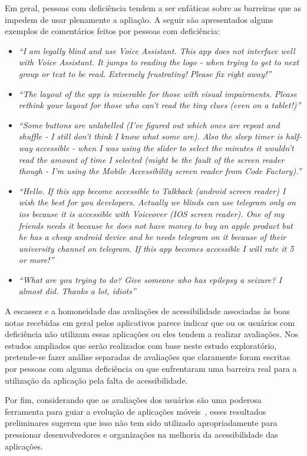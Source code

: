 Em geral, pessoas com deficiência tendem a ser enfáticas sobre as barreiras que as impedem de usar plenamente a apliação. A seguir são apresentados alguns exemplos de comentários feitos por pessoas com deficiência:
\begin{itemize}
 \item \textit{``I am legally blind and use Voice Assistant. This app does not interface well with Voice Assistant. It jumps to reading the logo - when trying to get to next group or text to be read. Extremely frustrating! Please fix right away!''}
  \item \textit{``The layout of the app is miserable for those with visual impairments. Please rethink your layout for those who can't read the tiny clues (even on a tablet!)''}
  \item \textit{``Some buttons are unlabelled (I've figured out which ones are repeat and shuffle - I still don't think I know what some are). Also the sleep timer is half-way accessible - when I was using the slider to select the minutes it wouldn't read the amount of time I selected (might be the fault of the screen reader though - I'm using the Mobile Accessibility screen reader from Code Factory).''}
  \item \textit{``Hello. If this app become accessible to Talkback (android screen reader) I wish the best for you developers. Actually we blinds can use telegram only on ios because it is accessible with Voiceover (IOS screen reader). One of my friends needs it because he does not have money to buy an apple product but he has a cheap android device and he needs telegram on it because of their university channel on telegram. If this app becomes accessible I will rate it 5 or more!''}
  \item \textit{``What are you trying to do? Give someone who has epilepsy a seizure? I almost did. Thanks a lot, idiots''}  
\end{itemize}

A escassez e a homoneidade das avaliações de acessibilidade associadas às boas notas recebidas em geral pelos aplicativos parece indicar que ou os usuários com deficiência não utilizam essas aplicações ou eles tendem a realizar avaliações. 
Nos estudos ampliados que serão realizados com base neste estudo exploratório, pretende-se fazer análise separadas de avaliações que claramente foram escritas por pessoas com alguma deficiência ou que enfrentaram uma barreira real para a utilização da aplicação pela falta de acessibilidade. 

Por fim, considerando que as avaliações dos usuários são uma poderosa ferramenta para guiar a evolução de aplicações móveis~\cite{Iacob2014online,Panichella2015how,Palomba2018crowdsourcing}, 
esses resultados preliminares sugerem que isso não tem sido utilizado apropriadamente para pressionar desenvolvedores e organizações na melhoria da acessibilidade das aplicações.

